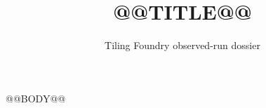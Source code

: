 \documentclass[11pt]{article}
\title{@@TITLE@@}
\author{Tiling Foundry observed-run dossier}
\date{}
\begin{document}
\maketitle
@@BODY@@
\end{document}
